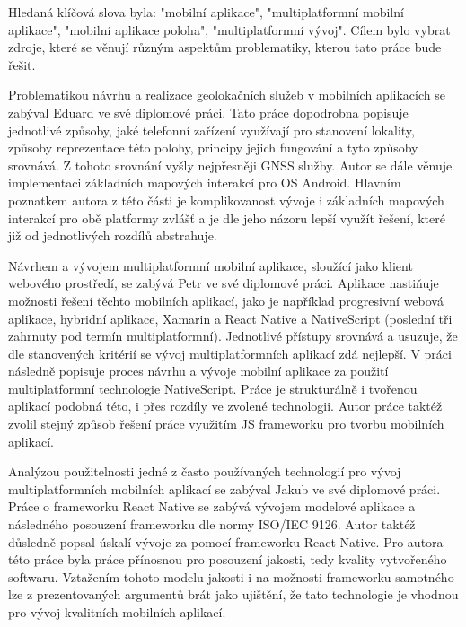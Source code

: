 Hledaná klíčová slova byla: "mobilní aplikace", "multiplatformní mobilní aplikace", "mobilní aplikace poloha", "multiplatformní vývoj". Cílem bylo vybrat zdroje, které se věnují různým aspektům problematiky, kterou tato práce bude řešit.

Problematikou návrhu a realizace geolokačních služeb v mobilních aplikacích se zabýval Eduard  \textcite{Bakes2018thesis} ve své diplomové práci. Tato práce dopodrobna popisuje jednotlivé způsoby, jaké telefonní zařízení využívají pro stanovení lokality, způsoby reprezentace této polohy, principy jejich fungování a tyto způsoby srovnává. Z tohoto srovnání vyšly nejpřesněji GNSS služby. Autor se dále věnuje implementaci základních mapových interakcí pro OS Android. Hlavním poznatkem autora z této části je komplikovanost vývoje i základních mapových interakcí pro obě platformy zvlášť a je dle jeho názoru lepší využít řešení, které již od jednotlivých rozdílů abstrahuje.


Návrhem a vývojem multiplatformní mobilní aplikace, sloužící jako klient webového prostředí, se zabývá Petr \textcite{Domkar2018} ve své diplomové práci. Aplikace nastiňuje možnosti řešení těchto mobilních aplikací, jako je například progresivní webová aplikace, hybridní aplikace, Xamarin a React Native a NativeScript (poslední tři zahrnuty pod termín multiplatformní). Jednotlivé přístupy srovnává a usuzuje, že dle stanovených kritérií se vývoj multiplatformních aplikací zdá nejlepší. V práci následně popisuje proces návrhu a vývoje mobilní aplikace za použití multiplatformní technologie NativeScript. Práce je strukturálně i tvořenou aplikací podobná této, i přes rozdíly ve zvolené technologii. Autor práce taktéž zvolil stejný způsob řešení práce využitím JS frameworku pro tvorbu mobilních aplikací.

Analýzou použitelnosti jedné z často používaných technologií pro vývoj multiplatformních mobilních aplikací se zabýval Jakub \textcite{Menda2018thesis} ve své diplomové práci. Práce o frameworku React Native se zabývá vývojem modelové aplikace a následného posouzení frameworku dle normy ISO/IEC 9126. Autor taktéž důsledně popsal úskalí vývoje za pomocí frameworku React Native. Pro autora této práce byla práce přínosnou pro posouzení jakosti, tedy kvality vytvořeného softwaru. Vztažením tohoto modelu jakosti i na možnosti frameworku samotného lze z prezentovaných argumentů brát jako ujištění, že tato technologie je vhodnou pro vývoj kvalitních mobilních aplikací.

